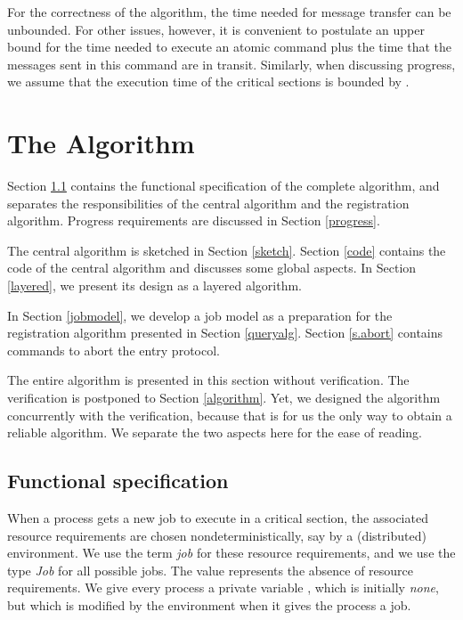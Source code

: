 \documentclass[10pt]{article} \usepackage[english]{babel}
\def\S #1/{\mbox {\textsl{#1}}}
\begin{document}
For the correctness of the algorithm, the time needed for message
transfer can be unbounded. For other issues, however, it is convenient
to postulate an upper bound  for the time needed to execute an
atomic command plus the time that the messages sent in this command
are in transit.  Similarly, when discussing progress, we assume that
the execution time of the critical sections is bounded by .

\section {The  Algorithm} \label{intromain}
\label{fifoalg}

Section \ref{funcspec} contains the functional specification of the
complete algorithm, and separates the responsibilities of the central
algorithm and the registration algorithm.   Progress requirements are
discussed in Section \ref {progress}.  

The central algorithm is sketched in Section \ref{sketch}. Section
\ref{code} contains the code of the central algorithm and discusses
some global aspects.  In Section \ref{layered}, we present its design
as a layered algorithm. 

In Section \ref{jobmodel}, we develop a job model as a preparation for
the registration algorithm presented in Section \ref{queryalg}.
Section \ref{s.abort} contains commands to abort the entry protocol.

The entire algorithm is presented in this section without
verification.  The verification is postponed to Section
\ref{algorithm}.  Yet, we designed the algorithm concurrently with the
verification, because that is for us the only way to obtain a reliable
algorithm.  We separate the two aspects here for the ease of reading.

\subsection{Functional specification} \label{funcspec}\label{safetyreq}

When a process gets a new job to execute in a critical section, the
associated resource requirements are chosen nondeterministically, say
by a (distributed) environment.  We use the term \emph{job} for these
resource requirements, and we use the type \S Job/ for all possible
jobs.  The value  represents the absence of resource
requirements.  We give every process  a private variable , which is initially \S none/, but which is modified by the
environment when it gives the process a job.
\end{document}
